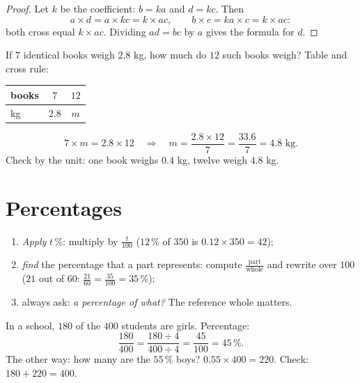 \begin{proof}
Let $k$ be the coefficient: $b = ka$ and $d = kc$. Then
\[
a \times d = a \times kc = k \times ac,
\qquad
b \times c = ka \times c = k \times ac :
\]
both cross  equal $k \times ac$. Dividing $ad = bc$ by $a$
gives the formula for $d$.
\end{proof}

\begin{example}\label{ex:g7:prop:fourth}
If $7$ identical books weigh $2.8$ kg, how much do $12$ such books
weigh? Table and cross rule:
\begin{center}
\renewcommand{\arraystretch}{1.3}
\begin{tabular}{l|cc}
books & $7$ & $12$ \\
\hline
kg & $2.8$ & $m$ \\
\end{tabular}
\end{center}
\[
7 \times m = 2.8 \times 12
\quad\Longrightarrow\quad
m = \frac{2.8 \times 12}{7} = \frac{33.6}{7} = 4.8 \text{ kg}.
\]
Check by the unit: one book weighs $0.4$ kg, twelve weigh $4.8$ kg.
\end{example}

\section{Percentages}

\begin{method}\label{met:g7:prop:percent}
\begin{enumerate}
  \item \emph{Apply} $t\,\%$: multiply by $\frac{t}{100}$
        ($12\,\%$ of $350$ is $0.12 \times 350 = 42$);
  \item \emph{find} the percentage that a part represents: compute
        $\frac{\text{part}}{\text{whole}}$ and rewrite over $100$
        ($21$ out of $60$: $\frac{21}{60} = \frac{35}{100} = 35\,\%$);
  \item always ask: \emph{a percentage of what?} The reference whole
        matters.
\end{enumerate}
\end{method}

\begin{example}\label{ex:g7:prop:percent}
In a school, $180$ of the $400$ students are girls. Percentage:
\[
\frac{180}{400} = \frac{180 \div 4}{400 \div 4} = \frac{45}{100}
= 45\,\% .
\]
The other way: how many are the $55\,\%$ boys?
$0.55 \times 400 = 220$. Check: $180 + 220 = 400$.
\end{example}

